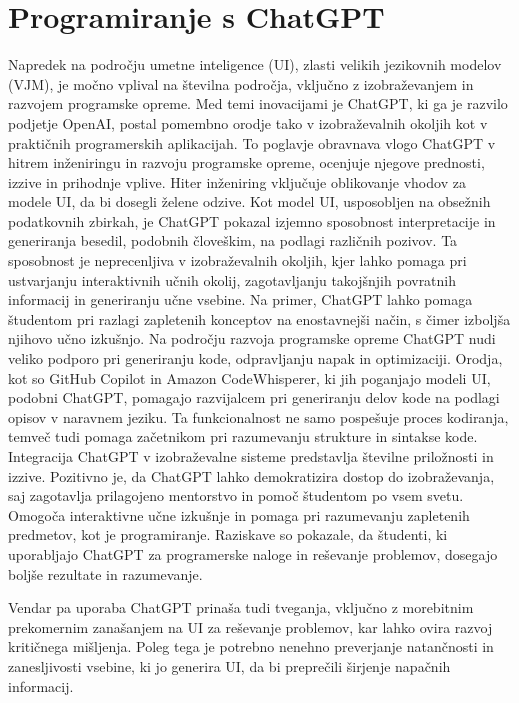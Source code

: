 \documentclass[12pt,a4paper]{book}
\begin{document}
\section{Programiranje s ChatGPT}
\cite{app13095783}
Napredek na področju umetne inteligence (UI), zlasti velikih jezikovnih modelov (VJM), je močno vplival na številna področja, vključno z izobraževanjem in razvojem programske opreme. Med temi inovacijami je ChatGPT, ki ga je razvilo podjetje OpenAI, postal pomembno orodje tako v izobraževalnih okoljih kot v praktičnih programerskih aplikacijah. To poglavje obravnava vlogo ChatGPT v hitrem inženiringu in razvoju programske opreme, ocenjuje njegove prednosti, izzive in prihodnje vplive.
Hiter inženiring vključuje oblikovanje vhodov za modele UI, da bi dosegli želene odzive. Kot model UI, usposobljen na obsežnih podatkovnih zbirkah, je ChatGPT pokazal izjemno sposobnost interpretacije in generiranja besedil, podobnih človeškim, na podlagi različnih pozivov. Ta sposobnost je neprecenljiva v izobraževalnih okoljih, kjer lahko pomaga pri ustvarjanju interaktivnih učnih okolij, zagotavljanju takojšnjih povratnih informacij in generiranju učne vsebine. Na primer, ChatGPT lahko pomaga študentom pri razlagi zapletenih konceptov na enostavnejši način, s čimer izboljša njihovo učno izkušnjo.
Na področju razvoja programske opreme ChatGPT nudi veliko podporo pri generiranju kode, odpravljanju napak in optimizaciji. Orodja, kot so GitHub Copilot in Amazon CodeWhisperer, ki jih poganjajo modeli UI, podobni ChatGPT, pomagajo razvijalcem pri generiranju delov kode na podlagi opisov v naravnem jeziku. Ta funkcionalnost ne samo pospešuje proces kodiranja, temveč tudi pomaga začetnikom pri razumevanju strukture in sintakse kode.
Integracija ChatGPT v izobraževalne sisteme predstavlja številne priložnosti in izzive. Pozitivno je, da ChatGPT lahko demokratizira dostop do izobraževanja, saj zagotavlja prilagojeno mentorstvo in pomoč študentom po vsem svetu. Omogoča interaktivne učne izkušnje in pomaga pri razumevanju zapletenih predmetov, kot je programiranje. Raziskave so pokazale, da študenti, ki uporabljajo ChatGPT za programerske naloge in reševanje problemov, dosegajo boljše rezultate in razumevanje.

Vendar pa uporaba ChatGPT prinaša tudi tveganja, vključno z morebitnim prekomernim zanašanjem na UI za reševanje problemov, kar lahko ovira razvoj kritičnega mišljenja. Poleg tega je potrebno nenehno preverjanje natančnosti in zanesljivosti vsebine, ki jo generira UI, da bi preprečili širjenje napačnih informacij.
\end{document}
